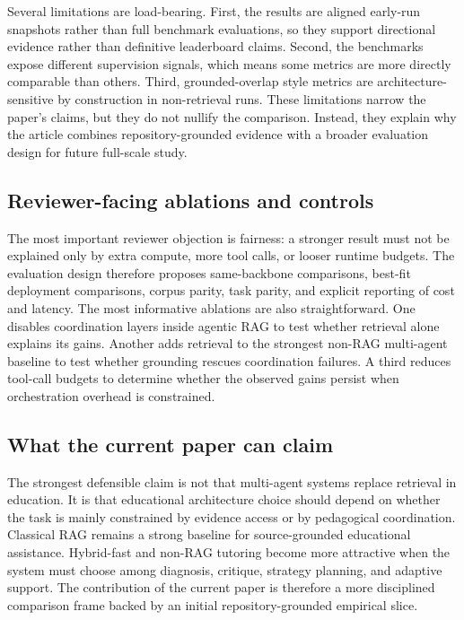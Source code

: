 Several limitations are load-bearing. First, the results are aligned early-run snapshots rather than full benchmark evaluations, so they support directional evidence rather than definitive leaderboard claims. Second, the benchmarks expose different supervision signals, which means some metrics are more directly comparable than others. Third, grounded-overlap style metrics are architecture-sensitive by construction in non-retrieval runs. These limitations narrow the paper's claims, but they do not nullify the comparison. Instead, they explain why the article combines repository-grounded evidence with a broader evaluation design for future full-scale study.

\subsection{Reviewer-facing ablations and controls}

The most important reviewer objection is fairness: a stronger result must not be explained only by extra compute, more tool calls, or looser runtime budgets. The evaluation design therefore proposes same-backbone comparisons, best-fit deployment comparisons, corpus parity, task parity, and explicit reporting of cost and latency. The most informative ablations are also straightforward. One disables coordination layers inside agentic RAG to test whether retrieval alone explains its gains. Another adds retrieval to the strongest non-RAG multi-agent baseline to test whether grounding rescues coordination failures. A third reduces tool-call budgets to determine whether the observed gains persist when orchestration overhead is constrained.

\subsection{What the current paper can claim}

The strongest defensible claim is not that multi-agent systems replace retrieval in education. It is that educational architecture choice should depend on whether the task is mainly constrained by evidence access or by pedagogical coordination. Classical RAG remains a strong baseline for source-grounded educational assistance. Hybrid-fast and non-RAG tutoring become more attractive when the system must choose among diagnosis, critique, strategy planning, and adaptive support. The contribution of the current paper is therefore a more disciplined comparison frame backed by an initial repository-grounded empirical slice.
